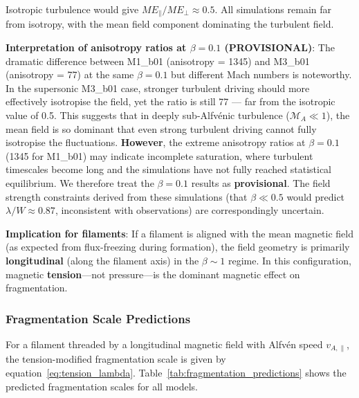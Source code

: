 \documentclass[11pt,a4paper]{article}
\begin{document}
Isotropic turbulence would give $ME_\parallel/ME_\perp \approx 0.5$. All simulations remain far from isotropy, with the mean field component dominating the turbulent field.

\textbf{Interpretation of anisotropy ratios at $\beta = 0.1$ (PROVISIONAL)}: The dramatic difference between M1\_b01 (anisotropy = 1345) and M3\_b01 (anisotropy = 77) at the same $\beta = 0.1$ but different Mach numbers is noteworthy. In the supersonic M3\_b01 case, stronger turbulent driving should more effectively isotropise the field, yet the ratio is still 77 — far from the isotropic value of 0.5. This suggests that in deeply sub-Alfv\'enic turbulence ($\mathcal{M}_A \ll 1$), the mean field is so dominant that even strong turbulent driving cannot fully isotropise the fluctuations. \textbf{However}, the extreme anisotropy ratios at $\beta = 0.1$ (1345 for M1\_b01) may indicate incomplete saturation, where turbulent timescales become long and the simulations have not fully reached statistical equilibrium. We therefore treat the $\beta = 0.1$ results as \textbf{provisional}. The field strength constraints derived from these simulations (that $\beta \ll 0.5$ would predict $\lambda/W \approx 0.87$, inconsistent with observations) are correspondingly uncertain.

\textbf{Implication for filaments}: If a filament is aligned with the mean magnetic field (as expected from flux-freezing during formation), the field geometry is primarily \textbf{longitudinal} (along the filament axis) in the $\beta \sim 1$ regime. In this configuration, magnetic \textbf{tension}—not pressure—is the dominant magnetic effect on fragmentation.

\subsubsection{Fragmentation Scale Predictions}

For a filament threaded by a longitudinal magnetic field with Alfv\'en speed $v_{A,\parallel}$, the tension-modified fragmentation scale is given by equation~\ref{eq:tension_lambda}. Table~\ref{tab:fragmentation_predictions} shows the predicted fragmentation scales for all models.
\end{document}
